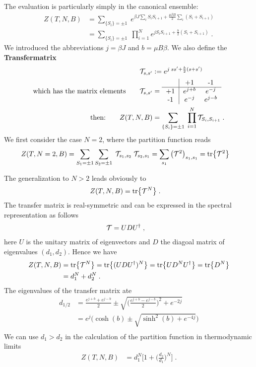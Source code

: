 The evaluation is particularly simply in the canonical ensemble:
\begin{align*}
Z(T,N,B) &= \sum_{\{S_{i}\}=\pm 1}\; e^{\beta J \sum_{ i} S_{i }S_{i+1} + \frac{\mu\beta B}{2} \sum_{i} (S_{i}+S_{i+1})}\\
 &= \sum_{\{S_{i}\}=\pm 1}\;
 \prod_{i=1}^{N}
  e^{j  S_{i }S_{i+1} + \frac{b}{2} (S_{i}+S_{i+1})}\;.
\end{align*}
%
We introduced the abbreviations $j = \beta J$ and $b = \mu B \beta$.
We also define the 
{\bf Transfermatrix}
%
\begin{subequations}\label{eq:transfer:1d}
\begin{align}
{\cal T}_{s,s'} &:=   e^{j \; s s' + \frac{b}{2} (s + s')}\\
%
\text{which has the  matrix elements}\qquad
{\cal T}_{s,s'}&=
\begin{tabular}{c|ccc}   & +1 & -1 \\\hline+1 & $e^{j+b}$ & $e^{-j}$  \\-1 & $e^{-j}$ & $e^{j-b}$
\end{tabular}\\
%
\text{then:}\qquad Z(T,N,B)&= \sum_{\{S_{i}\}=\pm 1}\;
 \prod_{i=1}^{N} {\cal T}_{S_{i},S_{i+1}}\;.
\end{align}
\end{subequations}
%
We first consider the case $N=2$, where the partition function reads
%
\begin{align*}
Z(T,N=2,B) &= \sum_{S_{1}=\pm 1}\sum_{S_{2}=\pm 1}\;
{\cal T}_{s_{1},s_{2}}\;{\cal T}_{s_{2},s_{1}} = \sum_{s_{1}} \big({\cal T}^{2}\big)_{s_{1},s_{1}} = \tr{{\cal T}^{2}}
\end{align*}
%

The generalization to $N>2$ leads  obviously to
%
\begin{align*}
Z(T,N,B) &= \tr{{\cal T}^{N}}\;.
\end{align*}
%
The transfer matrix is real-symmetric and can be expressed in the spectral representation as follows
%
\begin{align*}
{\cal T} &= U D U^\dagger\;,
\end{align*}
%
here  $U$ is the unitary matrix of eigenvectors and  $D$ the diagoal matrix of eigenvalues
 $(d_{1},d_{2})$. Hence we have
%
\begin{align*}
Z(T,N,B) &= \tr{{\cal T}^{N}}= \tr{(U D U^{\dagger})^{N}} =\tr{U D^{N} U^{\dagger}} = \tr{D^{N}}\\
&= d_{1}^{N} + d_{2}^{N}\;.
\end{align*}
% 
The eigenvalues of the transfer matrix ate
%
\begin{align*}
d_{1/2} &= \frac{e^{j+b}+e^{j-b} }{2} \pm
\sqrt{ \bigg(
\frac{e^{j+b}-e^{j-b} }{2}
\bigg)	^{2} + e^{-2 j}}\\
&= e^{j} \bigg(\cosh(b) \pm \sqrt{\sinh^{2}(b) + e^{-4j}}\bigg)\\
\end{align*}
We can use $d_{1}>d_{2}$ in the calculation of the partition function  in thermodynamic limits
%
\begin{align*}
Z(T,N,B) &= d_{1}^{N}\bigg[
1 + 
\bigg(
\frac{d_{2}}{d_{1}}
\bigg)^{N}
\bigg]\;.
\end{align*}
%
%
